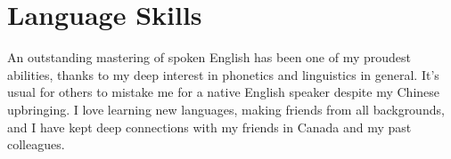 \section*{Language Skills}

An outstanding mastering of spoken English has been one of my proudest abilities,
thanks to my deep interest in phonetics and linguistics in general.
It's usual for others to mistake me for a native English speaker despite my Chinese upbringing.
I love learning new languages, making friends from all backgrounds, and I have kept deep connections with my friends in Canada and my past colleagues.